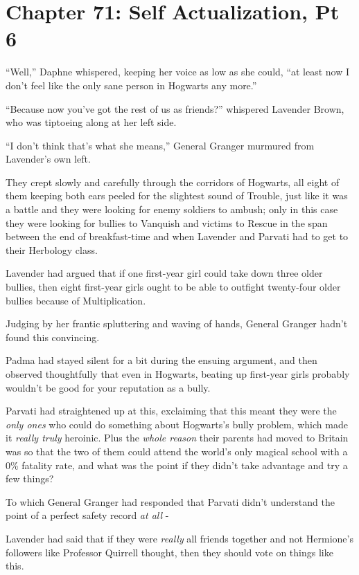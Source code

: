 \chapter{Chapter 71: Self Actualization, Pt 6}
``Well,'' Daphne whispered, keeping her voice as low as she could, ``at least now I don't feel like the only sane person in Hogwarts any more.''

``Because now you've got the rest of us as friends?'' whispered Lavender Brown, who was tiptoeing along at her left side.

``I don't think that's what she means,'' General Granger murmured from Lavender's own left.

They crept slowly and carefully through the corridors of Hogwarts, all eight of them keeping both ears peeled for the slightest sound of Trouble, just like it was a battle and they were looking for enemy soldiers to ambush; only in this case they were looking for bullies to Vanquish and victims to Rescue in the span between the end of breakfast-time and when Lavender and Parvati had to get to their Herbology class.

Lavender had argued that if one first-year girl could take down three older bullies, then eight first-year girls ought to be able to outfight twenty-four older bullies because of Multiplication.

Judging by her frantic spluttering and waving of hands, General Granger hadn't found this convincing.

Padma had stayed silent for a bit during the ensuing argument, and then observed thoughtfully that even in Hogwarts, beating up first-year girls probably wouldn't be good for your reputation as a bully.

Parvati had straightened up at this, exclaiming that this meant they were the \emph{only ones} who could do something about Hogwarts's bully problem, which made it \emph{really truly} heroinic. Plus the \emph{whole reason} their parents had moved to Britain was so that the two of them could attend the world's only magical school with a 0\% fatality rate, and what was the point if they didn't take advantage and try a few things?

To which General Granger had responded that Parvati didn't understand the point of a perfect safety record \emph{at all} -

Lavender had said that if they were \emph{really} all friends together and not Hermione's followers like Professor Quirrell thought, then they should vote on things like this.

